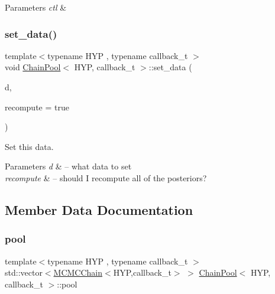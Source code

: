 \begin{DoxyParams}{Parameters}
{\em ctl} & \\
\hline
\end{DoxyParams}
\mbox{\label{class_chain_pool_af64237977e8608113092e5c1ea1ff965}} 
\subsubsection{\texorpdfstring{set\+\_\+data()}{set\_data()}}
{\footnotesize\ttfamily template$<$typename H\+YP , typename callback\+\_\+t $>$ \\
void \hyperlink{class_chain_pool}{Chain\+Pool}$<$ H\+YP, callback\+\_\+t $>$\+::set\+\_\+data (\begin{DoxyParamCaption}\item[{typename H\+Y\+P\+::data\+\_\+t $\ast$}]{d,  }\item[{bool}]{recompute = {\ttfamily true} }\end{DoxyParamCaption})\hspace{0.3cm}{\ttfamily [inline]}}



Set this data. 


\begin{DoxyParams}{Parameters}
{\em d} & -- what data to set \\
\hline
{\em recompute} & -- should I recompute all of the posteriors? \\
\hline
\end{DoxyParams}


\subsection{Member Data Documentation}
\mbox{\label{class_chain_pool_af89400f6e9a2312fe2ee7873745a6e91}} 
\subsubsection{\texorpdfstring{pool}{pool}}
{\footnotesize\ttfamily template$<$typename H\+YP , typename callback\+\_\+t $>$ \\
std\+::vector$<$\hyperlink{class_m_c_m_c_chain}{M\+C\+M\+C\+Chain}$<$H\+YP,callback\+\_\+t$>$ $>$ \hyperlink{class_chain_pool}{Chain\+Pool}$<$ H\+YP, callback\+\_\+t $>$\+::pool}


